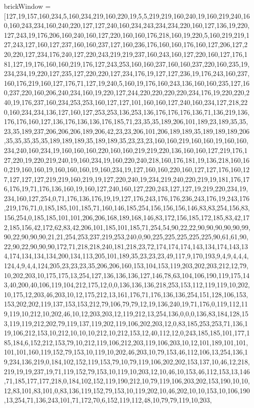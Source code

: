brickWindow = [127,19,157,160,234,5,160,234,219,160,220,19,5,5,219,219,160,240,19,160,219,240,160,160,243,234,160,240,220,127,127,240,160,234,243,234,234,220,160,127,136,19,220,127,243,19,176,206,160,240,160,127,220,160,160,176,218,160,19,220,5,160,219,219,127,243,127,160,127,237,160,160,237,127,160,236,176,160,160,176,160,127,206,127,220,220,127,234,176,240,127,220,243,219,219,237,160,243,160,127,220,160,127,176,181,127,19,176,160,160,219,176,127,243,253,160,160,237,160,160,237,220,160,235,19,234,234,19,220,127,235,127,220,220,127,234,176,19,127,127,236,19,176,243,160,237,160,176,219,160,127,176,71,127,19,240,5,160,19,176,160,243,136,160,160,235,127,160,237,220,160,206,240,234,160,19,220,127,244,220,220,220,220,234,176,19,220,220,240,19,176,237,160,234,253,253,160,127,127,101,160,160,127,240,160,234,127,218,220,160,234,234,136,127,160,127,253,253,136,253,136,176,176,176,136,71,136,219,136,176,176,160,127,136,176,136,136,176,185,71,23,35,35,189,206,101,189,23,189,35,35,23,35,189,237,206,206,206,189,206,42,23,23,206,101,206,189,189,35,189,189,189,206,35,35,35,35,35,189,189,189,35,189,189,35,23,23,23,160,160,219,160,160,19,160,160,234,240,160,234,19,160,160,160,220,160,160,219,219,220,136,160,160,127,219,176,127,220,19,220,219,240,19,160,234,19,160,220,240,218,160,176,181,19,136,218,160,160,219,160,160,19,160,160,160,19,160,234,19,127,160,160,220,160,127,127,176,160,127,127,127,127,219,219,160,219,19,127,220,240,19,234,219,240,220,219,19,181,176,176,176,19,71,176,136,160,19,160,127,240,160,127,220,243,127,127,19,219,220,234,19,234,160,127,254,0,71,176,136,176,19,19,127,176,243,176,176,236,243,176,19,243,176,219,176,71,0,185,185,101,185,71,160,146,185,254,156,156,156,146,83,83,254,156,83,156,254,0,185,185,101,101,206,206,168,189,168,146,83,172,156,185,172,185,83,42,172,185,156,42,172,62,83,42,206,101,185,101,185,71,254,54,90,22,22,90,90,90,90,90,99,90,22,90,90,90,21,21,254,253,237,219,253,240,0,90,225,225,225,225,225,90,61,61,90,22,90,22,90,90,90,172,71,218,218,240,181,218,23,72,174,174,174,143,134,174,143,134,174,134,134,134,200,134,113,205,101,189,35,23,23,23,49,117,9,170,193,9,4,9,4,4,4,124,4,9,4,4,124,205,23,23,23,35,206,206,160,153,104,153,119,203,202,203,212,12,79,10,202,203,10,175,175,13,254,127,136,136,136,127,146,78,63,104,106,190,119,175,143,40,200,40,106,119,104,212,175,12,0,0,136,136,136,218,253,153,112,119,119,10,202,10,175,12,203,46,203,10,12,175,212,13,161,176,71,176,136,136,254,151,128,106,153,153,202,202,119,137,153,153,212,79,106,79,79,12,19,136,240,19,71,176,0,119,112,119,119,10,212,10,202,46,10,12,203,203,12,119,212,13,254,136,0,0,0,136,83,184,128,153,119,119,212,202,79,119,137,119,202,119,106,202,203,12,0,83,185,253,253,71,136,119,106,212,153,10,212,10,10,10,212,10,212,153,12,40,112,12,0,243,185,185,101,177,185,184,6,152,212,153,79,10,212,119,106,212,203,119,106,203,10,12,101,189,101,101,101,101,160,119,152,79,153,10,119,10,202,46,203,10,79,153,46,112,106,13,254,136,19,234,136,219,0,184,102,152,119,153,79,10,79,119,106,202,202,153,137,10,46,12,218,219,19,19,237,19,71,119,152,79,153,10,119,10,203,12,10,46,10,153,46,112,153,13,146,71,185,177,177,218,0,184,102,152,119,190,212,10,79,119,106,203,202,153,190,10,10,12,83,101,83,101,0,83,136,119,152,79,153,10,119,202,10,46,202,10,10,153,10,106,190,13,254,71,136,243,101,71,172,70,6,152,119,112,48,10,79,79,119,10,203,